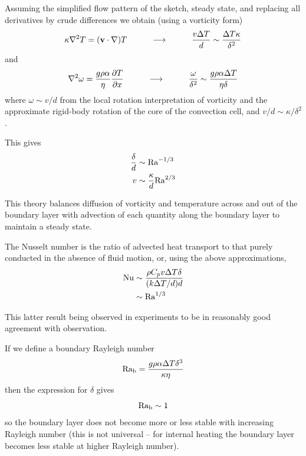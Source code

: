 \documentclass[10pt]{article}
\begin{document}
	Assuming the simplified flow pattern of the sketch, steady state, and replacing all derivatives
	by crude differences we obtain (using a vorticity form)
		\begin{equation}
				\kappa \nabla^2 T = (\mathbf{v} \cdot \nabla) T
					\mbox{\hspace{1cm}} \longrightarrow \mbox{\hspace{1cm}} 
				\frac{v \Delta T}{d} \sim \frac{\Delta T \kappa}{\delta^2} 
		\end{equation}
	and
		\begin{equation}
				\nabla^2 \omega = \frac{g \rho \alpha}{\eta} \frac{\partial T}{\partial x}
					\mbox{\hspace{1cm}} \longrightarrow \mbox{\hspace{1cm}} 
				\frac{\omega}{\delta ^2}	\sim  \frac{g \rho \alpha \Delta T}{\eta \delta}
		\end{equation}
	where $\omega\sim v / d$ from the local rotation interpretation of
	vorticity and the approximate rigid-body rotation of the core of the convection cell,
	and $v/d \sim \kappa / \delta^2$.
		
	This gives
		\begin{align}
			\frac{\delta}{d} & \sim {\rm Ra}^{-1/3} \\
			v & \sim \frac{\kappa}{d} {\rm Ra}^{2/3} 
		\end{align}	
	
	This theory balances diffusion of vorticity and temperature across and out of the 
	boundary layer with advection of each quantity along the boundary layer to maintain
	a steady state.
	
	The Nusselt number is the ratio of advected heat transport to that purely 
	conducted in the absence of fluid motion, or, using the above approximations,
		\begin{equation}
			\begin{split}	
				{\rm Nu} 	& \sim \frac{\rho C_p v \Delta T \delta}{(k \Delta T/d)d} \\
								& \sim {\rm Ra}^{1/3}
			\end{split}
		\end{equation}
	
	This latter result being observed in experiments to be in reasonably
	good agreement with observation. 
	
	If we define a boundary Rayleigh number
		\begin{equation}
			{\rm Ra_b} = \frac{g \rho \alpha \Delta T \delta^3}{\kappa \eta}
		\end{equation}
	then the expression for $\delta$ gives
		\begin{equation}
			{\rm Ra_b} \sim 1
		\end{equation}	
	so the boundary layer does not become more or less stable with increasing Rayleigh
	number (this is not universal -- for internal heating the boundary layer
	becomes less stable at higher Rayleigh number).	
	
\end{document}
